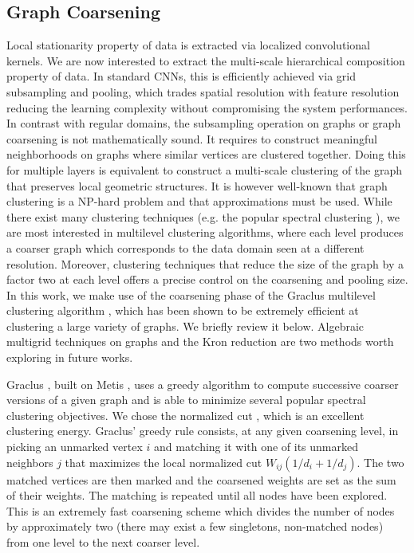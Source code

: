 \documentclass{article}
\newcommand{\todo}[1]{{\color{red} #1 }}
\begin{document}
\subsection{Graph Coarsening} \label{sec:coarsening}
Local stationarity property of data is extracted via localized convolutional kernels. We are now interested to extract the multi-scale hierarchical composition property of data. In standard CNNs, this is efficiently achieved via grid subsampling and pooling, which trades spatial resolution with feature resolution reducing the learning complexity without compromising the system performances. In contrast with regular domains, the subsampling operation on graphs or graph coarsening is not mathematically sound. It requires to construct meaningful neighborhoods on
graphs where similar vertices are clustered together. Doing this for multiple
layers is equivalent to construct a multi-scale clustering of the graph that
preserves local geometric structures. It is however well-known that graph
clustering is a NP-hard problem \cite{art:BuiJonesGraphPartNPhard} and that
approximations must be used. While there exist many clustering techniques (e.g.
the popular spectral clustering \cite{art:VonLuxburg07Tutorial}), we are most
interested in multilevel clustering algorithms, where each level produces a
{coarser} graph which corresponds to the data domain seen at a different
{resolution}. Moreover, clustering techniques that reduce the size of the
graph by a factor two at each level offers a precise control on the coarsening
and pooling size. In this work, we make use of the coarsening phase of the
Graclus multilevel clustering algorithm \cite{art:DhillonGuanKulis07Graclus},
which has been shown to be extremely efficient at clustering a large variety of
graphs. We briefly review it below. Algebraic multigrid techniques on graphs
\cite{art:RonSafroBrandt11MultigridGraph} and the Kron reduction
\cite{art:ShumanFarajiVandergheynst16PyramTrans} are two methods worth exploring
in future works. %

Graclus \cite{art:DhillonGuanKulis07Graclus}, built on Metis \cite{art:KarypisKumar98Metis}, uses a greedy
algorithm to compute successive coarser versions of a given graph and is able to
minimize several popular spectral clustering objectives. We chose the normalized
cut \cite{art:ShiMalik00NCut}, which is an excellent clustering energy.
Graclus' greedy rule consists, at any given coarsening level, in
picking an unmarked vertex $i$ and matching it with one of its unmarked
neighbors $j$ that maximizes the local normalized cut $W_{ij} (1/d_i + 1/d_j)$.
The two matched vertices are then marked and the coarsened weights are set as
the sum of their weights. The matching is repeated until all nodes have been
explored. This is an extremely fast coarsening scheme which divides the number
of nodes by approximately two (there may exist a few singletons, non-matched nodes)
from one level to the next coarser level.
\end{document}
